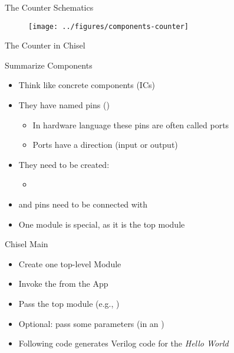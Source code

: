 \begin{frame}[fragile]{The Counter Schematics}
\begin{figure}
  \texttt{[image: ../figures/components-counter]}
\end{figure}
\end{frame}

\begin{frame}[fragile]{The Counter in Chisel}
\end{frame}

\begin{frame}[fragile]{Summarize Components}
\begin{itemize}
\item Think like concrete components (ICs)
\item They have named pins ()
\begin{itemize}
\item In hardware language these pins are often called ports
\item Ports have a direction (input or output)
\end{itemize}
\item They need to be created:
\begin{itemize}
\item {}
\end{itemize}
\item and pins need to be connected with \code{:=}
\item One module is special, as it is the top module
\end{itemize}
\end{frame}




\begin{frame}[fragile]{Chisel Main}

\begin{itemize}
\item Create one top-level Module
\item Invoke the  from the App
\item Pass the top module (e.g., )
\item Optional: pass some parameters (in an )
\item Following code generates Verilog code for the \emph{Hello World}
\end{itemize}
\end{frame}

